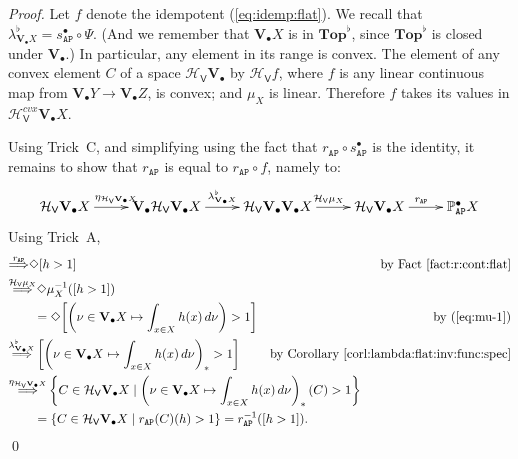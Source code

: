 \documentclass[preprint,12pt]{elsarticle}
\newcommand\Pred{\mathbb{P}}
\newcommand\Angel{{\mathtt{A}}}
\newcommand\Nature{{\mathtt{P}}}
\newcommand\AN{{\Angel\Nature}}
\newcommand\invto[1]{{\buildrel {#1} \over\Longrightarrow}}
\newcommand\Hoare{{\mathcal H}}
\newcommand\Vt{\mathsf{V}}
\newcommand\HV{\Hoare_\Vt}
\newcommand\Val{{\mathbf V}}
\newcommand\Topcat{\mathbf{Top}}
\begin{document}
\begin{proof}
  Let $f$ denote the idempotent (\ref{eq:idemp:flat}).  We recall that
  $\lambda^\flat_{\Val_\bullet X} = s_\AN^\bullet \circ \Psi$.  (And
  we remember that $\Val_\bullet X$ is in $\Topcat^\flat$, since
  $\Topcat^\flat$ is closed under $\Val_\bullet$.)  In particular, any
  element in its range is convex.  The element of any convex element
  $C$ of a space $\HV {\Val_\bullet}$ by $\HV f$, where $f$ is any
  linear continuous map from $\Val_\bullet Y \to \Val_\bullet Z$, is
  convex; and $\mu_X$ is linear.  Therefore $f$ takes its values in
  $\HV^{cvx} {\Val_\bullet X}$.

  Using Trick~C, and simplifying using the fact that $r_\AN \circ
  s_\AN^\bullet$ is the identity, it remains to show that $r_\AN$ is
  equal to $r_\AN \circ f$, namely to:
  \[
    \xymatrix{
      \HV {\Val_\bullet X} \ar[r]^{\eta_{\HV {\Val_\bullet X}}}
      & \Val_\bullet {\HV {\Val_\bullet X}}
      \ar[r]^{\lambda^\flat_{\Val_\bullet X}}
      & \HV {\Val_\bullet {\Val_\bullet X}}
      \ar[r]^{\HV {\mu_X}}
      & \HV {\Val_\bullet X}
      \ar[r]^{r_\AN}
      & \Pred_\AN^\bullet X
    }
  \]
  Using Trick~A,
  \begin{align*}
    [h > 1]
    & \invto{r_\AN}
      \Diamond {[h > 1]}
    & \text{by Fact~\ref{fact:r:cont:flat}} \\
    & \invto{\HV {\mu_X}}
      \Diamond {\mu_X^{-1} ([h > 1])} \\
    & \qquad= \Diamond {\left[\left(\nu \in \Val_\bullet X \mapsto \int_{x \in
      X} h (x) \,d\nu\right) > 1\right]}
    & \text{by (\ref{eq:mu-1})} \\
    & \invto{\lambda^\flat_{\Val_\bullet X}}
      \left[\left(\nu \in \Val_\bullet X \mapsto \int_{x \in
      X} h (x) \,d\nu\right)_* > 1\right]
    & \text{by Corollary~\ref{corl:lambda:flat:inv:func:spec}} \\
    & \invto{\eta_{\HV {\Val_\bullet X}}}
      \left\{C \in \HV {\Val_\bullet X} \mid \left(\nu \in \Val_\bullet X \mapsto \int_{x \in
      X} h (x) \,d\nu\right)_* (C) > 1\right\}
    \mskip-360mu \\
    & \qquad= \left\{C \in \HV {\Val_\bullet X} \mid r_\AN (C) (h) > 1 \right\}
      = r_\AN^{-1} ([h > 1]).
      \mskip-250mu
  \end{align*}
  \qed
\end{proof}
\end{document}
